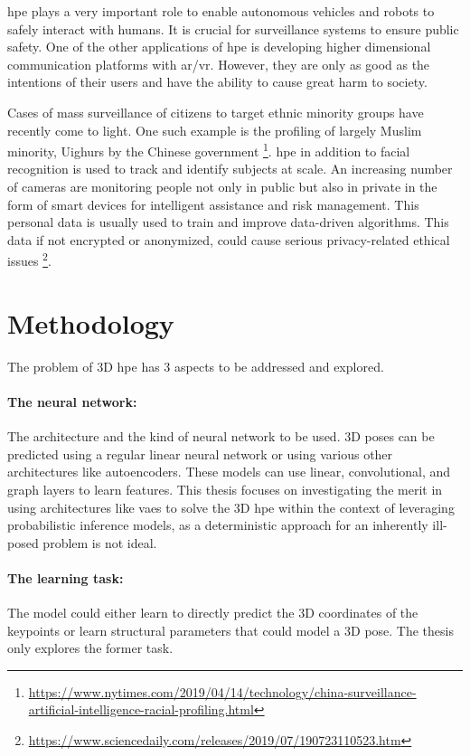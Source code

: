 \ac{hpe} plays a very important role to enable autonomous vehicles and robots to safely interact with humans. It is crucial for surveillance systems to ensure public safety. One of the other applications of \ac{hpe} is developing higher dimensional communication platforms with \ac{ar/vr}. However, they are only as good as the intentions of their users and have the ability to cause great harm to society. 

Cases of mass surveillance of citizens to target ethnic minority groups have recently come to light. One such example is the profiling of largely Muslim minority, Uighurs by the Chinese government \footnote{\url{https://www.nytimes.com/2019/04/14/technology/china-surveillance-artificial-intelligence-racial-profiling.html}}. \ac{hpe} in addition to facial recognition is used to track and identify subjects at scale. An increasing number of cameras are monitoring people not only in public but also in private in the form of smart devices for intelligent assistance and risk management. This personal data is usually used to train and improve data-driven algorithms. This data if not encrypted or anonymized, could cause serious privacy-related ethical issues \footnote{\url{https://www.sciencedaily.com/releases/2019/07/190723110523.htm}}.

\section{Methodology}
\label{sec:methodology}
The problem of 3D \ac{hpe} has 3 aspects to be addressed and explored.

\paragraph{The neural network:} The architecture and the kind of neural network to be used. 3D poses can be predicted using a regular linear neural network or using various other architectures like autoencoders. These models can use linear, convolutional, and graph layers to learn features. This thesis focuses on investigating the merit in using architectures like \acp{vae} to solve the 3D \ac{hpe} within the context of leveraging probabilistic inference models, as a deterministic approach for an inherently ill-posed problem is not ideal.

\paragraph{The learning task:} The model could either learn to directly predict the 3D coordinates of the keypoints or learn structural parameters that could model a 3D pose. The thesis only explores the former task.

